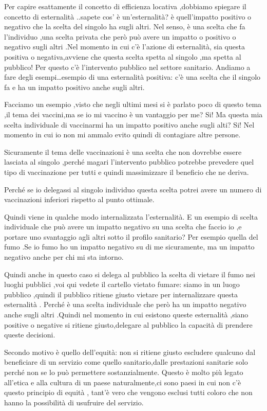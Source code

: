 Per capire esattamente il concetto di efficienza locativa ,dobbiamo
spiegare il concetto di esternalità ..sapete cos' è un'esternalità? è
quell'impatto positivo o negativo che la scelta del singolo ha sugli
altri. Nel senso, è una scelta che fa l'individuo ,una scelta privata
che però può avere un impatto o positivo o negativo sugli altri .Nel
momento in cui c'è l'azione di esternalità, sia questa positiva o
negativa,avviene che questa scelta spetta al singolo ,ma spetta al
pubblico! Per questo c'è l'intervento pubblico nel settore sanitario.
Andiamo a fare degli esempi\ldots{}esempio di una esternalità positiva:
c'è una scelta che il singolo fa e ha un impatto positivo anche sugli
altri.

Facciamo un esempio ,visto che negli ultimi mesi si è parlato poco di
questo tema ,il tema dei vaccini,ma se io mi vaccino è un vantaggio per
me? Si! Ma questa mia scelta individuale di vaccinarmi ha un impatto
positivo anche sugli alti? Si! Nel momento in cui io non mi ammalo evito
quindi di contagiare altre persone.

Sicuramente il tema delle vaccinazioni è una scelta che non dovrebbe
essere lasciata al singolo ,perché magari l'intervento pubblico potrebbe
prevedere quel tipo di vaccinazione per tutti e quindi massimizzare il
beneficio che ne deriva.

Perché se io delegassi al singolo individuo questa scelta potrei avere
un numero di vaccinazioni inferiori rispetto al punto ottimale.

Quindi viene in qualche modo internalizzata l'esternalità. E un esempio
di scelta individuale che può avere un impatto negativo su una scelta
che faccio io ,e portare uno svantaggio agli altri sotto il profilo
sanitario? Per esempio quella del fumo .Se io fumo ho un impatto
negativo su di me sicuramente, ma un impatto negativo anche per chi mi
sta intorno.

Quindi anche in questo caso si delega al pubblico la scelta di vietare
il fumo nei luoghi pubblici ,voi qui vedete il cartello vietato fumare:
siamo in un luogo pubblico ,quindi il pubblico ritiene giusto vietare
per internalizzare questa esternalità . Perché è una scelta individuale
che però ha un impatto negativo anche sugli altri .Quindi nel momento in
cui esistono queste esternalità ,siano positive o negative si ritiene
giusto,delegare al pubblico la capacità di prendere queste decisioni.

Secondo motivo è quello dell'equità: non si ritiene giusto escludere
qualcuno dal beneficiare di un servizio come quello sanitario,dalle
prestazioni sanitarie solo perché non se lo può permettere
sostanzialmente. Questo è molto più legato all'etica e alla cultura di
un paese naturalmente,ci sono paesi in cui non c'è questo principio di
equità , tant'è vero che vengono esclusi tutti coloro che non hanno la
possibilità di usufruire del servizio.

